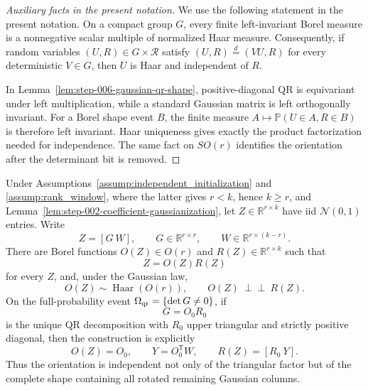 \begin{proof}[Auxiliary facts in the present notation]
We use the following statement in the present notation. On a compact group \(G\), every finite left-invariant
Borel measure is a nonnegative scalar multiple of normalized Haar measure.
Consequently, if random variables \((U,R)\in G\times\mathcal R\) satisfy
\((U,R)\stackrel d=(VU,R)\) for every deterministic \(V\in G\), then \(U\)
is Haar and independent of \(R\).

In
Lemma~\ref{lem:step-006-gaussian-qr-shape}, positive-diagonal QR is equivariant
under left multiplication, while a standard Gaussian matrix is left
orthogonally invariant. For a Borel shape event \(B\), the finite measure
\(A\mapsto\mathbb P(U\in A,R\in B)\) is therefore left invariant. Haar
uniqueness gives exactly the product factorization needed for independence.
The same fact on \(SO(r)\) identifies the orientation after the determinant
bit is removed.

\end{proof}



\begin{lemma}
\label{lem:step-006-gaussian-qr-shape}
Under Assumptions~\ref{assump:independent_initialization} and
\ref{assump:rank_window}, where the latter gives \(r<k\), hence \(k\ge r\),
and Lemma~\ref{lem:step-002-coefficient-gaussianization}, let
\(Z\in\mathbb R^{r\times k}\) have iid \(\mathcal N(0,1)\) entries. Write
\[
  Z=[G\ W],\qquad G\in\mathbb R^{r\times r},
  \qquad W\in\mathbb R^{r\times(k-r)}.
\]
There are Borel functions \(O(Z)\in O(r)\) and
\(R(Z)\in\mathbb R^{r\times k}\) such that
\[
  Z=O(Z)R(Z)                                                   \tag{2}
\]
for every \(Z\), and, under the Gaussian law,
\[
  O(Z)\sim\operatorname{Haar}(O(r)),
  \qquad O(Z)\ \perp\!\!\!\perp\ R(Z).                       \tag{3}
\]
On the full-probability event \(\Omega_{\rm qr}=\{\det G\ne0\}\), if
\[
  G=O_0R_0
\]
is the unique QR decomposition with \(R_0\) upper triangular and strictly
positive diagonal, then the construction is explicitly
\[
  O(Z)=O_0,\qquad
  Y=O_0^{\mathsf T}W,\qquad
  R(Z)=[R_0\ Y].                                               \tag{4}
\]
Thus the orientation is independent not only of the triangular factor but of
the complete shape containing all rotated remaining Gaussian columns.

\end{lemma}

